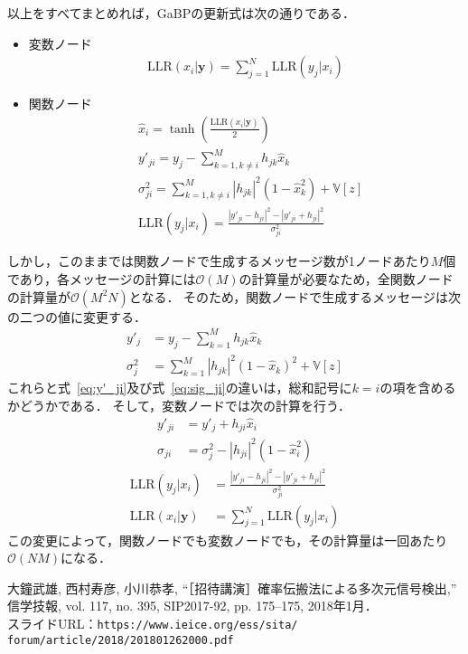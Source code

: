 \documentclass[twocolumn, a4paper]{ieicejsp}
\newcommand{\ABS}[1]{\left|#1\right|}
\begin{document}
以上をすべてまとめれば，GaBPの更新式は次の通りである．
\begin{itemize}
  \item 変数ノード
  \begin{align}
    \mathrm{LLR}(x_i | \mathbf{y}) = \sum_{j=1}^N \mathrm{LLR}(y_j | x_i)
  \end{align}
  \item 関数ノード
  \begin{align}
    &\hat{x}_i = \tanh\left(\frac{\mathrm{LLR}(x_i|\mathbf{y})}{2}\right)\\
    &y'_{ji} = y_j - \sum_{k=1, k\not=i}^{M} h_{jk} \hat{x}_k \label{eq:y'_ji} \\
    &\sigma^2_{ji} = \sum_{k=1,k\not=i}^{M} |h_{jk}|^2 (1- \hat{x}_k^2) + \mathbb{V}[z] \label{eq:sig_ji} \\
    &\mathrm{LLR}(y_j | x_i) = \frac{\ABS{y'_{ji} - h_{ji}}^2 - \ABS{y'_{ji} + h_{ji}}^2}{\sigma_{ji}^2}
  \end{align}
\end{itemize}
しかし，このままでは関数ノードで生成するメッセージ数が1ノードあたり$M$個であり，各メッセージの計算には$\mathcal{O}(M)$の計算量が必要なため，全関数ノードの計算量が$\mathcal{O}(M^2 N)$となる．
そのため，関数ノードで生成するメッセージは次の二つの値に変更する．
\begin{align}
  y'_{j} &= y_j - \sum_{k=1}^{M} h_{jk} \hat{x}_k \\
  \sigma_{j}^{2} &= \sum_{k=1}^{M} \ABS{h_{jk}}^2 (1 - \hat{x}_k)^2 + \mathbb{V}[z]
\end{align}
これらと式~\eqref{eq:y'_ji}及び式~\eqref{eq:sig_ji}の違いは，総和記号に$k=i$の項を含めるかどうかである．
そして，変数ノードでは次の計算を行う．
\begin{align}
  y'_{ji} &= y'_j + h_{ji} \hat{x}_i \\
  \sigma_{ji} &= \sigma_{j}^2 - \ABS{h_{ji}}^2 (1 - \hat{x}_i^2)
\end{align}
\begin{align}
  \mathrm{LLR}(y_j | x_i) &= \frac{\ABS{y'_{ji} - h_{ji}}^2 - \ABS{y'_{ji} + h_{ji}}^2}{\sigma_{ji}^2} \\
  \mathrm{LLR}(x_i | \mathbf{y}) &= \sum_{j=1}^N \mathrm{LLR}(y_j | x_i)
\end{align}
この変更によって，関数ノードでも変数ノードでも，その計算量は一回あたり$\mathcal{O}(NM)$になる．



\begin{thebibliography}{99}
 大鐘武雄, 西村寿彦, 小川恭孝, ``［招待講演］確率伝搬法による多次元信号検出,'' 信学技報, vol. 117, no. 395, SIP2017-92, pp. 175--175, 2018年1月． \\スライドURL：\verb|https://www.ieice.org/ess/sita/|
\verb|forum/article/2018/201801262000.pdf|

\end{thebibliography}
\end{document}
